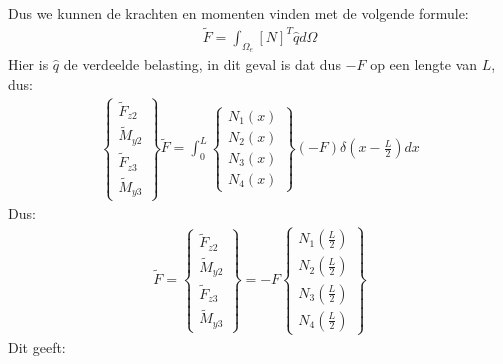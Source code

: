 \documentclass[a4paper,11pt,twoside]{report}
\begin{document}
Dus we kunnen de krachten en momenten vinden met de volgende formule:
\begin{align*}
    \tilde{F} = \int_{\Omega_e}^{} [N]^T \hat{q} d\Omega
\end{align*}
Hier is $\hat{q}$ de verdeelde belasting, in dit geval is dat dus $-F$ op een lengte van $L$, dus:
\begin{align*}
    \begin{Bmatrix}
        \tilde{F}_{z2} \\
        \tilde{M}_{y2} \\
        \tilde{F}_{z3} \\
        \tilde{M}_{y3}
    \end{Bmatrix}
    \tilde{F} = \int_0^L
    \begin{Bmatrix}
        N_1(x) \\
        N_2(x) \\
        N_3(x) \\
        N_4(x)
    \end{Bmatrix}
    (-F)
    \delta(x - \frac{L}{2}) dx
\end{align*}
Dus:
\begin{align*}
    \tilde{F} =
    \begin{Bmatrix}
        \tilde{F}_{z2} \\
        \tilde{M}_{y2} \\
        \tilde{F}_{z3} \\
        \tilde{M}_{y3}
    \end{Bmatrix}
    =
    -F
    \begin{Bmatrix}
        N_1(\frac{L}{2}) \\
        N_2(\frac{L}{2}) \\
        N_3(\frac{L}{2}) \\
        N_4(\frac{L}{2})
    \end{Bmatrix}
\end{align*}
Dit geeft:
\end{document}
